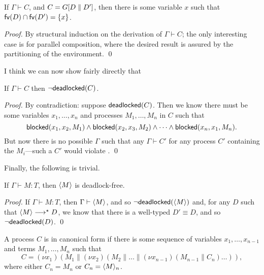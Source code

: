 \documentclass[orivec,envcountsame]{llncs}
\begin{document}
\begin{lemma}\label{thm:procs-share-one-channel}
  If $\Gamma \vdash C$, and $C = G[D \parallel D']$, then there is some variable $x$ such that
  $\mathsf{fv}(D) \cap \mathsf{fv}(D') = \{ x \}$.
\end{lemma}

\begin{proof}
  By structural induction on the derivation of $\Gamma \vdash C$; the only interesting case is for
  parallel composition, where the desired result is assured by the partitioning of the
  environment. \qed
\end{proof}

I think we can now show fairly directly that

\begin{lemma}\label{thm:typed-configs-df}
  If $\Gamma \vdash C$ then $\lnot \mathsf{deadlocked}(C)$.
\end{lemma}

\begin{proof}
  By contradiction: suppose $\mathsf{deadlocked}(C)$.  Then we know there must be some variables
  $x_1,\dots,x_n$ and processes $M_1,\dots,M_n$ in $C$ such that
  \[
    \mathsf{blocked}(x_1,x_2,M_1) \land \mathsf{blocked}(x_2,x_3,M_2) \land \cdots \land \mathsf{blocked}(x_n,x_1,M_n).
  \]
  But now there is no possible $\Gamma$ such that any $\Gamma \vdash C'$ for any process $C'$
  containing the $M_i$---such a $C'$ would violate .  \qed
\end{proof}

Finally, the following is trivial.

\begin{theorem}\label{thm:typed-terms-df}
  If $\Gamma \vdash M: T$, then $\langle M \rangle$ is deadlock-free.
\end{theorem}

\begin{proof}
  If $\Gamma \vdash M: T$, then $\Gamma \vdash \langle M \rangle$, and so
  $\lnot\mathsf{deadlocked}(\langle M \rangle)$ and, for any $D$ such that $\langle M \rangle \longrightarrow^\star D$, we
  know that there is a well-typed $D' \equiv D$, and so $\lnot\mathsf{deadlocked}(D)$. \qed
\end{proof}

\begin{definition}
A process $C$ is in canonical form if there is some sequence of variables $x_1,\dots,x_{n-1}$ and
terms $M_1,\dots,M_n$ such that
\[
  C = (\nu x_1)(M_1 \parallel (\nu x_2)(M_2 \parallel \dots \parallel (\nu x_{n-1})(M_{n-1} \parallel C_n)\dots)),
\]
where either $C_n = M_n$ or $C_n = \langle M \rangle_n$.
\end{definition}
\end{document}
